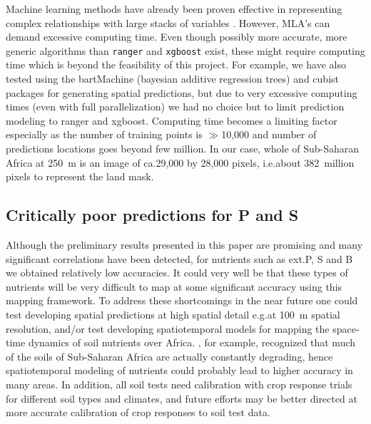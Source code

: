 \begin{linenumbers}
Machine learning methods have already been proven effective in representing complex relationships with large stacks of variables \citep{strobl2009introduction,biau2012analysis}. However, MLA's can demand excessive computing time. Even though possibly more accurate, more generic algorithms than \texttt{ranger} and \texttt{xgboost} exist, these might require computing time which is beyond the feasibility of this project. For example, we have also tested using the \textsf{bartMachine} (bayesian additive regression trees) \citep{kapelner2013bartmachine} and \textsf{cubist} \citep{kuhn2013cubist} packages for generating spatial predictions, but due to very excessive computing times (even with full parallelization) we had no choice but to limit prediction modeling to \textsf{ranger} and \textsf{xgboost}. Computing time becomes a limiting factor especially as the number of training points is $\gg$10,000 and number of predictions locations goes beyond few million. In our case, whole of Sub-Saharan Africa at \SI{250}{\metre} is an image of ca.\@ 29,000 by 28,000 pixels, i.e.\@ about 382~million pixels to represent the land mask.\par 

\subsection{Critically poor predictions for P and S}

Although the preliminary results presented in this paper are promising and many significant correlations have been detected, for nutrients such as ext.\@ P, S and B we obtained relatively low accuracies. It could very well be that these types of nutrients will be very difficult to map at some significant accuracy using this mapping framework. To address these shortcomings in the near future one could test developing spatial predictions at high spatial detail e.g.\@ at \SI{100}{\metre} spatial resolution, and/or test developing spatiotemporal models for mapping the space-time dynamics of soil nutrients over Africa. \citet{Drechsel2001}, for example, recognized that much of the soils of Sub-Saharan Africa are actually constantly degrading, hence spatiotemporal modeling of nutrients could probably lead to higher accuracy in many areas. In addition, all soil tests need calibration with crop response trials for different soil types and climates, and future efforts may be better directed at more accurate calibration of crop responses to soil test data.\par


\end{linenumbers}
